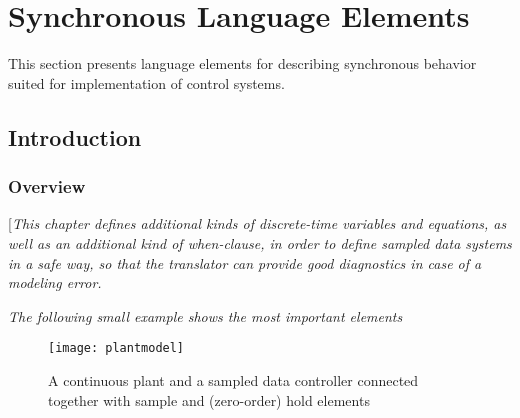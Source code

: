 \chapter{Synchronous Language Elements}

This section presents language elements for describing synchronous
behavior suited for implementation of control systems.

\section{Introduction}

\subsection{Overview}

{[}\emph{This chapter defines additional kinds of discrete-time
variables and equations, as well as an additional kind of when-clause,
in order to define sampled data systems in a safe way, so that the
translator can provide good diagnostics in case of a modeling error. }

\emph{The following small example shows the most important elements}

\begin{figure}[H]
\caption{A continuous plant and a sampled data controller connected
together with sample and (zero-order) hold elements}
\begin{center}
\texttt{[image: plantmodel]}
\end{center}
\end{figure}

